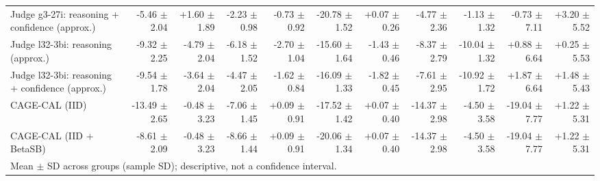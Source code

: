 \begin{tabular}{lrrrrrrrrrr}
Judge g3-27i: reasoning + confidence (approx.) & -5.46 {\scriptsize $\pm$ 2.04} & +1.60 {\scriptsize $\pm$ 1.89} & -2.23 {\scriptsize $\pm$ 0.98} & -0.73 {\scriptsize $\pm$ 0.92} & -20.78 {\scriptsize $\pm$ 1.52} & +0.07 {\scriptsize $\pm$ 0.26} & -4.77 {\scriptsize $\pm$ 2.36} & -1.13 {\scriptsize $\pm$ 1.32} & -0.73 {\scriptsize $\pm$ 7.11} & +3.20 {\scriptsize $\pm$ 5.52} \\
Judge l32-3bi: reasoning (approx.) & -9.32 {\scriptsize $\pm$ 2.25} & -4.79 {\scriptsize $\pm$ 2.04} & -6.18 {\scriptsize $\pm$ 1.52} & -2.70 {\scriptsize $\pm$ 1.04} & -15.60 {\scriptsize $\pm$ 1.64} & -1.43 {\scriptsize $\pm$ 0.46} & -8.37 {\scriptsize $\pm$ 2.79} & -10.04 {\scriptsize $\pm$ 1.32} & +0.88 {\scriptsize $\pm$ 6.64} & +0.25 {\scriptsize $\pm$ 5.53} \\
Judge l32-3bi: reasoning + confidence (approx.) & -9.54 {\scriptsize $\pm$ 1.78} & -3.64 {\scriptsize $\pm$ 2.04} & -4.47 {\scriptsize $\pm$ 2.05} & -1.62 {\scriptsize $\pm$ 0.84} & -16.09 {\scriptsize $\pm$ 1.33} & -1.82 {\scriptsize $\pm$ 0.45} & -7.61 {\scriptsize $\pm$ 2.95} & -10.92 {\scriptsize $\pm$ 1.72} & +1.87 {\scriptsize $\pm$ 6.64} & +1.48 {\scriptsize $\pm$ 5.43} \\
CAGE-CAL (IID) & -13.49 {\scriptsize $\pm$ 2.65} & -0.48 {\scriptsize $\pm$ 3.23} & -7.06 {\scriptsize $\pm$ 1.45} & +0.09 {\scriptsize $\pm$ 0.91} & -17.52 {\scriptsize $\pm$ 1.42} & +0.07 {\scriptsize $\pm$ 0.40} & -14.37 {\scriptsize $\pm$ 2.98} & -4.50 {\scriptsize $\pm$ 3.58} & -19.04 {\scriptsize $\pm$ 7.77} & +1.22 {\scriptsize $\pm$ 5.31} \\
CAGE-CAL (IID + BetaSB) & -8.61 {\scriptsize $\pm$ 2.09} & -0.48 {\scriptsize $\pm$ 3.23} & -8.66 {\scriptsize $\pm$ 1.44} & +0.09 {\scriptsize $\pm$ 0.91} & -20.06 {\scriptsize $\pm$ 1.34} & +0.07 {\scriptsize $\pm$ 0.40} & -14.37 {\scriptsize $\pm$ 2.98} & -4.50 {\scriptsize $\pm$ 3.58} & -19.04 {\scriptsize $\pm$ 7.77} & +1.22 {\scriptsize $\pm$ 5.31} \\
\bottomrule
\multicolumn{11}{l}{\scriptsize Mean $\pm$ SD across groups (sample SD); descriptive, not a confidence interval.} \\
\end{tabular}
